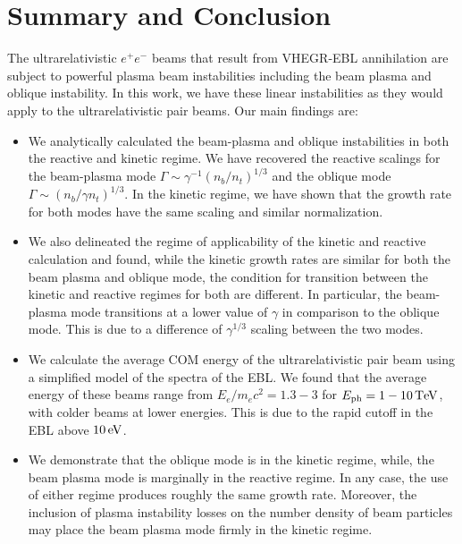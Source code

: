 \documentclass[usenatbib,iop,apj,numberedappendix]{aeb_emulateapj_2015}
\def\eV{{\rm eV}} %
\def\TeV{{\rm T}\eV} %
\newcommand{\epm}{\ensuremath{e^+e^-}}
\begin{document}
\section{Summary and Conclusion}\label{sec:conclusions}

The ultrarelativistic $\epm$ beams that result from VHEGR-EBL annihilation are subject to powerful plasma beam instabilities including the beam plasma and oblique instability.  In this work, we have these linear instabilities as they would apply to the ultrarelativistic pair beams.  Our main findings are:
\begin{itemize}
\item{We analytically calculated the beam-plasma and oblique instabilities in both the reactive and kinetic regime.  We have recovered the reactive scalings for the beam-plasma mode $\Gamma \sim \gamma^{-1}(n_b/n_t)^{1/3}$ and the oblique mode $\Gamma \sim (n_b/\gamma n_t)^{1/3}$.  In the kinetic regime, we have shown that the growth rate for both modes have the same scaling and similar normalization.}
\item{We also delineated the regime of applicability of the kinetic and reactive calculation and found, while the kinetic growth rates are similar for both the beam plasma and oblique mode, the condition for transition between the kinetic and reactive regimes for both are different.  In particular, the beam-plasma mode transitions at a lower value of $\gamma$ in comparison to the oblique mode.  This is due to a difference of $\gamma^{1/3}$ scaling between the two modes.}
\item{We calculate the average COM energy of the ultrarelativistic pair beam using a simplified model of the spectra of the EBL.  We found that the average energy of these beams range from $E_e/m_e c^2 = 1.3-3$ for $E_{\rm ph} = 1-10\,\TeV$, with colder beams at lower energies.  This is due to the rapid cutoff in the EBL above $10\,\eV$. }
\item{We demonstrate that the oblique mode is in the kinetic regime, while, the beam plasma mode is marginally in the reactive regime. In any case, the use of either regime produces roughly the same growth rate.  Moreover, the inclusion of plasma instability losses on the number density of beam particles may place the beam plasma mode firmly in the kinetic regime.}
\end{itemize}
\end{document}
